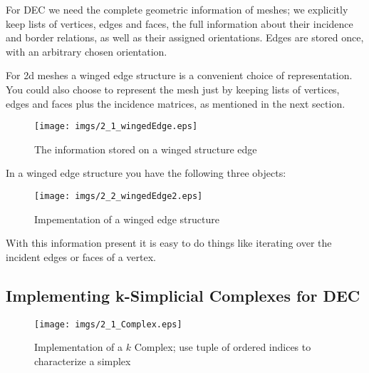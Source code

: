 For DEC we need the complete geometric information of meshes; we explicitly keep lists of vertices, edges and faces, the full information about their incidence and border relations, as well as their assigned orientations. Edges are stored once, with an arbitrary chosen orientation.

For 2d meshes a winged edge structure is a convenient choice of representation. You could also choose to represent the mesh just by keeping lists of vertices, edges and faces plus the incidence matrices, as mentioned in the next section. 

\begin{figure}[tb]
\begin{center}
\texttt{[image: imgs/2\_1\_wingedEdge.eps]}%
\end{center}
\caption{The information stored on a winged structure edge}%
\label{figs::2_1_wingedEdge}%
\end{figure}

In a winged edge structure you have the following three objects:
\begin{figure}[h]
\begin{center}
\texttt{[image: imgs/2\_2\_wingedEdge2.eps]}
\caption{Impementation of a winged edge structure}
\end{center}
\end{figure}

With this information present it is easy to do things like iterating over the incident edges or faces of a vertex.



\subsection{Implementing k-Simplicial Complexes for DEC}

\begin{figure}%
	\begin{center}
	\texttt{[image: imgs/2\_1\_Complex.eps]}%
	\end{center}
	\caption{Implementation of a $k$ Complex; use tuple of ordered indices to characterize a simplex}%
	\label{fig::2_1_Complex}%
\end{figure}

